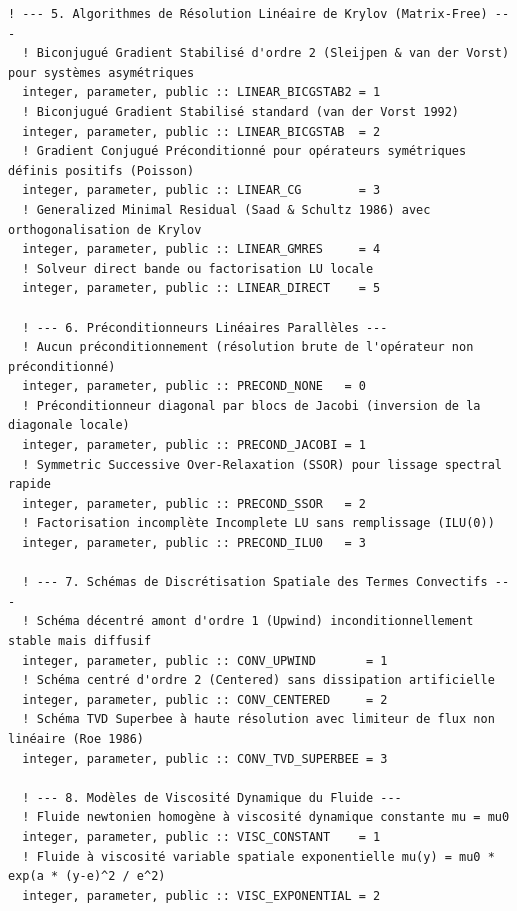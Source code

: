 \documentclass[10pt,a4paper,oneside]{book}
\begin{document}
\begin{lstlisting}[language={[95]Fortran}]
  ! --- 5. Algorithmes de Résolution Linéaire de Krylov (Matrix-Free) ---
  ! Biconjugué Gradient Stabilisé d'ordre 2 (Sleijpen & van der Vorst) pour systèmes asymétriques
  integer, parameter, public :: LINEAR_BICGSTAB2 = 1
  ! Biconjugué Gradient Stabilisé standard (van der Vorst 1992)
  integer, parameter, public :: LINEAR_BICGSTAB  = 2
  ! Gradient Conjugué Préconditionné pour opérateurs symétriques définis positifs (Poisson)
  integer, parameter, public :: LINEAR_CG        = 3
  ! Generalized Minimal Residual (Saad & Schultz 1986) avec orthogonalisation de Krylov
  integer, parameter, public :: LINEAR_GMRES     = 4
  ! Solveur direct bande ou factorisation LU locale
  integer, parameter, public :: LINEAR_DIRECT    = 5

  ! --- 6. Préconditionneurs Linéaires Parallèles ---
  ! Aucun préconditionnement (résolution brute de l'opérateur non préconditionné)
  integer, parameter, public :: PRECOND_NONE   = 0
  ! Préconditionneur diagonal par blocs de Jacobi (inversion de la diagonale locale)
  integer, parameter, public :: PRECOND_JACOBI = 1
  ! Symmetric Successive Over-Relaxation (SSOR) pour lissage spectral rapide
  integer, parameter, public :: PRECOND_SSOR   = 2
  ! Factorisation incomplète Incomplete LU sans remplissage (ILU(0))
  integer, parameter, public :: PRECOND_ILU0   = 3

  ! --- 7. Schémas de Discrétisation Spatiale des Termes Convectifs ---
  ! Schéma décentré amont d'ordre 1 (Upwind) inconditionnellement stable mais diffusif
  integer, parameter, public :: CONV_UPWIND       = 1
  ! Schéma centré d'ordre 2 (Centered) sans dissipation artificielle
  integer, parameter, public :: CONV_CENTERED     = 2
  ! Schéma TVD Superbee à haute résolution avec limiteur de flux non linéaire (Roe 1986)
  integer, parameter, public :: CONV_TVD_SUPERBEE = 3

  ! --- 8. Modèles de Viscosité Dynamique du Fluide ---
  ! Fluide newtonien homogène à viscosité dynamique constante mu = mu0
  integer, parameter, public :: VISC_CONSTANT    = 1
  ! Fluide à viscosité variable spatiale exponentielle mu(y) = mu0 * exp(a * (y-e)^2 / e^2)
  integer, parameter, public :: VISC_EXPONENTIAL = 2


\end{lstlisting}
\end{document}
